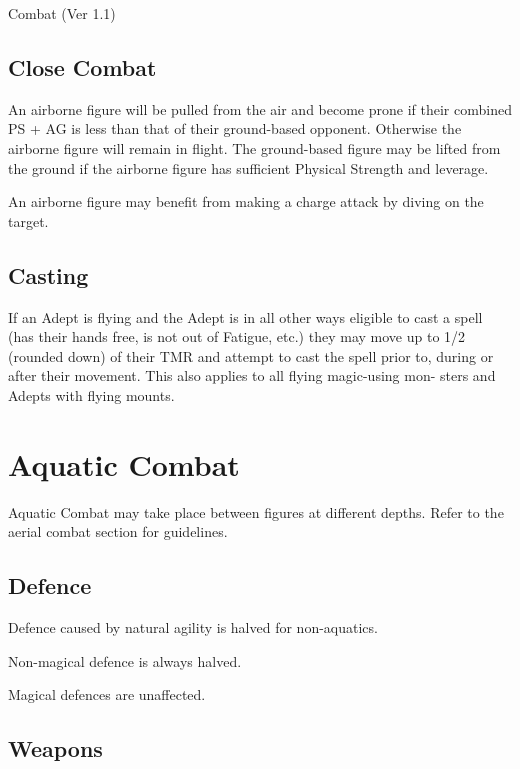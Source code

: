 \begin{Chapter}{Combat (Ver 1.1)}
\subsection{Close Combat}

An airborne figure will be pulled from the air and become prone if
their combined PS + AG is less than that of their ground-based
opponent.  Otherwise the airborne figure will remain in flight.  The
ground-based figure may be lifted from the ground if the airborne
figure has sufficient Physical Strength and leverage.

An airborne figure may benefit from making a charge attack by diving
on the target.

\subsection{Casting}

If an Adept is flying and the Adept is in all other ways eligible to
cast a spell (has their hands free, is not out of Fatigue, etc.)  they
may move up to 1/2 (rounded down) of their TMR and attempt to cast the
spell prior to, during or after their movement.  This also applies to
all flying magic-using mon- sters and Adepts with flying mounts.

\section{Aquatic Combat}

Aquatic Combat may take place between figures at different
depths. Refer to the aerial combat section for guidelines.

\subsection{Defence }

\begin{Itemize}
\item Defence caused by natural agility is halved for non-aquatics.

\item Non-magical defence is always halved.  

\item  Magical defences are unaffected. 

\end{Itemize}

\subsection{Weapons}


\end{Chapter}

